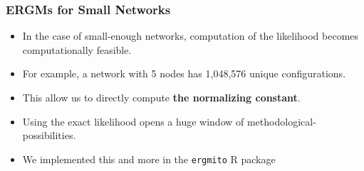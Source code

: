 \documentclass[aspectratio=169, 9pt, handout]{beamer}\usepackage[]{graphicx}\usepackage[]{color}
\newcommand{\ergmitopkg}[0]{\texttt{ergmito}}
\begin{document}
\begin{frame}[label=ergmito]
\frametitle{ERGMs for Small Networks}

\pause
\begin{itemize}[<+->]

\item In the case of small-enough networks, computation of the likelihood becomes
computationally feasible.

\item For example, a network with 5 nodes has 1,048,576
unique configurations.

\item This allow us to directly compute {\bf\color{normconst} the normalizing constant}.

\item Using the exact likelihood opens a huge window of methodological-possibilities.

\item We implemented this and more in the \ergmitopkg{} R package \hyperlink{ergmitopkg}{}

\end{itemize}




\end{frame}
\end{document}
